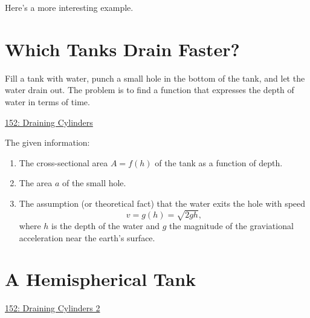 \documentclass{ximera}
\begin{document}
Here's a more interesting example.

\section{Which Tanks Drain Faster?}
Fill a tank with water, punch a small hole in the bottom of the tank, and let the water drain out. The problem is to find a function that expresses the depth of water in terms of time.

\begin{onlineOnly}
    \begin{center}
\end{center}
\end{onlineOnly}

\href{https://www.desmos.com/calculator/zltxdekv7z}{152: Draining Cylinders}

The given information:

\begin{enumerate}
\item The cross-sectional area $A=f(h)$ of the tank as a function of depth.

\item The area $a$ of the small hole.

\item The assumption (or theoretical fact) that the water exits the hole with speed
\[
  v = g(h) =\sqrt{2gh},
\] 
where $h$ is the depth of the water and $g$ the magnitude of the graviational acceleration near the earth's surface.
\end{enumerate}



\section{A Hemispherical Tank}

\begin{onlineOnly}
    \begin{center}
\end{center}
\end{onlineOnly}

\href{https://www.desmos.com/calculator/ggqodhz3jv}{152: Draining Cylinders 2}
\end{document}
